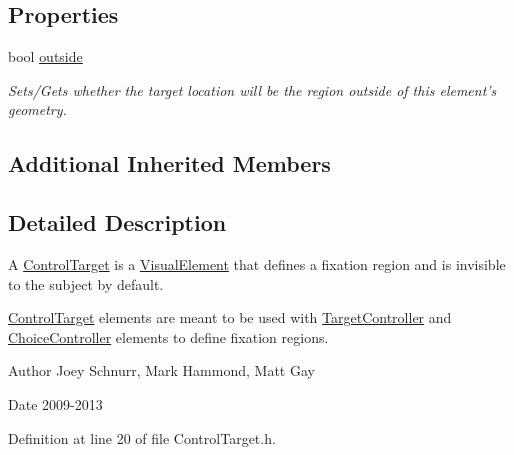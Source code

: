\subsection*{Properties}
\begin{DoxyCompactItemize}
\item 
\hypertarget{class_picto_1_1_control_target_aec615efdebbbe2b0a5e4f31d5b4c44c5}{bool \hyperlink{class_picto_1_1_control_target_aec615efdebbbe2b0a5e4f31d5b4c44c5}{outside}}\label{class_picto_1_1_control_target_aec615efdebbbe2b0a5e4f31d5b4c44c5}

\begin{DoxyCompactList}\small\item\em Sets/\-Gets whether the target location will be the region outside of this element's geometry. \end{DoxyCompactList}\end{DoxyCompactItemize}
\subsection*{Additional Inherited Members}


\subsection{Detailed Description}
A \hyperlink{class_picto_1_1_control_target}{Control\-Target} is a \hyperlink{struct_picto_1_1_visual_element}{Visual\-Element} that defines a fixation region and is invisible to the subject by default. 

\hyperlink{class_picto_1_1_control_target}{Control\-Target} elements are meant to be used with \hyperlink{class_picto_1_1_target_controller}{Target\-Controller} and \hyperlink{class_picto_1_1_choice_controller}{Choice\-Controller} elements to define fixation regions. \begin{DoxyAuthor}{Author}
Joey Schnurr, Mark Hammond, Matt Gay 
\end{DoxyAuthor}
\begin{DoxyDate}{Date}
2009-\/2013 
\end{DoxyDate}


Definition at line 20 of file Control\-Target.\-h.



